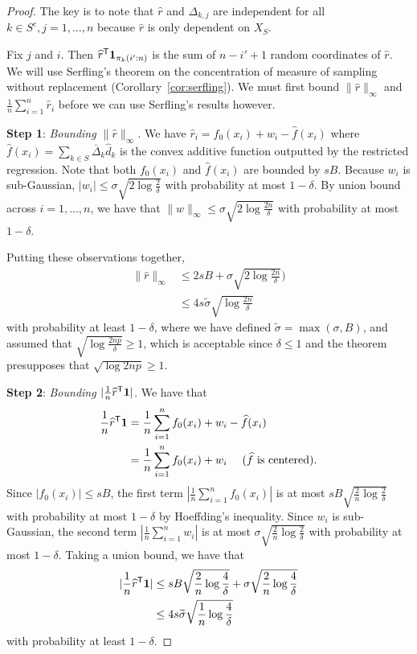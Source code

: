 \begin{proof}
The key is to note that $\hat{r}$ and $\Delta_{k,j}$ are independent for all $k \in S^c,j=1,...,n$ because $\hat{r}$ is only dependent on $X_{S}$.

Fix $j$ and $i$. Then $\widehat{r}^{\mathsf{T}} \mbox{\boldmath $1$}_{\pi_k(i':n)}$ is the sum
of $n-i'+1$ random coordinates of $\hat{r}$. We will use
Serfling's theorem on the concentration of measure of sampling without
replacement (Corollary~\ref{cor:serfling}). We must first bound $\|
\hat{r} \|_\infty$ and $\frac{1}{n} \sum_{i=1}^n \hat{r}_i$ before we
can use Serfling's results however.

\vskip5pt
\textbf{Step 1}: {\it Bounding $\| \hat{r} \|_\infty$.} We have $\hat{r}_i = f_0(x_i) + w_i - \hat{f}(x_i)$ where
$\hat{f}(x_i) = \sum_{k \in S} \bar{\Delta}_k \hat{d}_k$ is the convex
additive function outputted by the restricted regression. Note that
both $f_0(x_i)$ and $\hat{f}(x_i)$ are bounded by $sB$. 
Because $w_i$ is sub-Gaussian, $|w_i| \leq  \sigma \sqrt{2\log \frac{2}{\delta}}$ with probability at most $1-\delta$. By union bound across $i=1,...,n$, we have that $\| w\|_\infty \leq \sigma \sqrt{ 2 \log \frac{2n}{\delta}}$ with probability at most $1 - \delta$.

Putting these observations together,
\begin{align}
\| \hat{r} \|_\infty &\leq 2sB + \sigma \sqrt{ 2\log \frac{2n}{\delta}}) \nonumber \\
      &\leq 4 s \tilde{\sigma} \sqrt{\log \frac{2n}{\delta}} \label{eqn:stepone_rhat}
\end{align}
with probability at least $1 - \delta$, where we have defined
$\tilde{\sigma} = \max(\sigma, B)$,
and assumed that $\sqrt{\log \frac{2np}{\delta}} \geq 1$, which is acceptable since $\delta \leq 1$ and the theorem presupposes that $\sqrt{ \log 2np } \geq 1$.

\vskip5pt
\textbf{Step 2}: {\it Bounding $| \frac{1}{n} \widehat{r}^{\mathsf{T}} \mbox{\boldmath $1$}
  |$.}  We have that 
\begin{align*}
\frac{1}{n} \widehat{r}^{\mathsf{T}} \mbox{\boldmath $1$} &= 
    \frac{1}{n} \sum_{i=1}^n f_0(x_i) + w_i - \widehat{f}(x_i) \\
  &= \frac{1}{n} \sum_{i=1}^n f_0(x_i) + w_i \quad \textrm{ ($\widehat{f}$ is centered)}.
\end{align*}
Since $|f_0(x_i)| \leq sB$, the first term $| \frac{1}{n} \sum_{i=1}^n
f_0(x_i)|$ is at most $sB \sqrt{\frac{2}{n} \log \frac{2}{\delta}}$
with probability at most $1-\delta$ by Hoeffding's inequality. Since
$w_i$ is sub-Gaussian, the second term $|\frac{1}{n} \sum_{i=1}^n
w_i|$ is at most $\sigma \sqrt{ \frac{2}{n} \log \frac{2}{\delta}}$
with probability at most $1-\delta$.  
Taking a union bound, we have that 
\begin{align}
| \frac{1}{n} \widehat{r}^{\mathsf{T}} \mbox{\boldmath $1$}| &\leq sB \sqrt{\frac{2}{n} \log \frac{4}{\delta}} +  \sigma \sqrt{\frac{2}{n} \log \frac{4}{\delta}} \nonumber \\
  &\leq 4 s \widetilde{\sigma} \sqrt{\frac{1}{n} \log \frac{4}{\delta}} \label{eqn:steptwo_rhat}
\end{align}
with probability at least $1-\delta$.


\end{proof}
